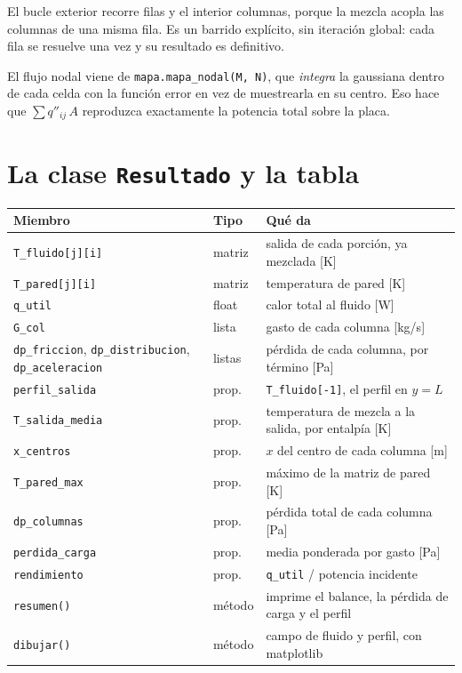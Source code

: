 \documentclass[11pt,a4paper]{article}
\begin{document}
El bucle exterior recorre filas y el interior columnas, porque la mezcla acopla
las columnas de una misma fila. Es un barrido explícito, sin iteración global:
cada fila se resuelve una vez y su resultado es definitivo.

El flujo nodal viene de \texttt{mapa.mapa\_nodal(M, N)}, que \emph{integra} la
gaussiana dentro de cada celda con la función error en vez de muestrearla en su
centro. Eso hace que $\sum q''_{ij}\,A$ reproduzca exactamente la potencia total
sobre la placa.

\section{La clase \texttt{Resultado} y la tabla}

\begin{center}
\begin{tabular}{lll}
  \toprule
  Miembro & Tipo & Qué da \\
  \midrule
  \texttt{T\_fluido[j][i]} & matriz & salida de cada porción, ya mezclada [K] \\
  \texttt{T\_pared[j][i]}  & matriz & temperatura de pared [K] \\
  \texttt{q\_util}         & float  & calor total al fluido [W] \\
  \texttt{G\_col}          & lista  & gasto de cada columna [kg/s] \\
  \texttt{dp\_friccion}, \texttt{dp\_distribucion}, \texttt{dp\_aceleracion} & listas & pérdida de cada columna, por término [Pa] \\
  \texttt{perfil\_salida}  & prop.  & \texttt{T\_fluido[-1]}, el perfil en $y=L$ \\
  \texttt{T\_salida\_media}& prop.  & temperatura de mezcla a la salida, por entalpía [K] \\
  \texttt{x\_centros}      & prop.  & $x$ del centro de cada columna [m] \\
  \texttt{T\_pared\_max}   & prop.  & máximo de la matriz de pared [K] \\
  \texttt{dp\_columnas}    & prop.  & pérdida total de cada columna [Pa] \\
  \texttt{perdida\_carga}  & prop.  & media ponderada por gasto [Pa] \\
  \texttt{rendimiento}     & prop.  & \texttt{q\_util} / potencia incidente \\
  \texttt{resumen()}       & método & imprime el balance, la pérdida de carga y el perfil \\
  \texttt{dibujar()}       & método & campo de fluido y perfil, con matplotlib \\
  \bottomrule
\end{tabular}
\end{center}
\end{document}
